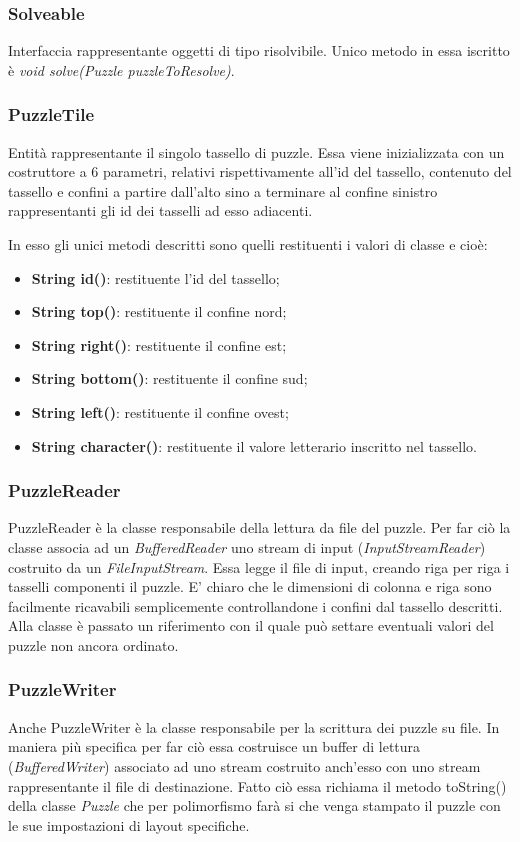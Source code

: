 \documentclass[11pt]{article}
\begin{document}
\subsubsection{Solveable}
Interfaccia rappresentante oggetti di tipo risolvibile. Unico metodo in essa iscritto è \textit{void solve(Puzzle puzzleToResolve)}.
\subsubsection{PuzzleTile}
Entità rappresentante il singolo tassello di puzzle. Essa viene inizializzata con un costruttore a 6 parametri, relativi rispettivamente all'id del tassello, contenuto del tassello e confini a partire dall'alto sino a terminare al confine sinistro rappresentanti gli id dei tasselli ad esso adiacenti.

In esso gli unici metodi descritti sono quelli restituenti i valori di classe e cioè:
\begin{itemize}
    \item \textbf{String id()}: restituente l'id del tassello;
    \item \textbf{String top()}: restituente il confine nord;
    \item \textbf{String right()}: restituente il confine est;
    \item \textbf{String bottom()}: restituente il confine sud;
    \item \textbf{String left()}: restituente il confine ovest;
    \item \textbf{String character()}: restituente il valore letterario inscritto nel tassello.
\end{itemize}
\subsubsection{PuzzleReader}
PuzzleReader è la classe responsabile della lettura da file del puzzle. Per far ciò la classe associa ad un \textit{BufferedReader} uno stream di input (\textit{InputStreamReader}) costruito da un \textit{FileInputStream}. 
Essa legge il file di input, creando riga per riga i tasselli componenti il puzzle. E' chiaro che le dimensioni di colonna e riga sono facilmente ricavabili semplicemente controllandone i confini dal tassello descritti.
Alla classe è passato un riferimento con il quale può settare eventuali valori del puzzle non ancora ordinato.
\subsubsection{PuzzleWriter}
Anche PuzzleWriter è la classe responsabile per la scrittura dei puzzle su file. In maniera più specifica per far ciò essa costruisce un buffer di lettura (\textit{BufferedWriter}) associato ad uno stream costruito anch'esso con uno stream rappresentante il file di destinazione. Fatto ciò essa richiama il metodo toString() della classe \textit{Puzzle} che per polimorfismo farà si che venga stampato il puzzle con le sue impostazioni di layout specifiche.
\end{document}
